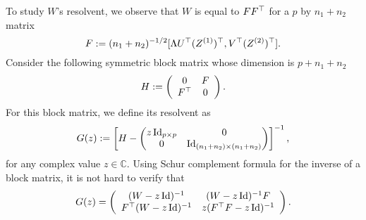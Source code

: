 To study $W$'s resolvent, we observe that $W$ is equal to $FF^{\top}$ for a $p$ by $n_1 + n_2$ matrix
	\[ F := (n_1+ n_2)^{-1/2} [\Lambda U^\top (Z^{(1)})^\top,V^\top (Z^{(2)})^\top]. \]
Consider the following symmetric block matrix whose dimension is $p + n_1 + n_2$
 \begin{equation}\label{linearize_block}
    H \define \left( {\begin{array}{*{20}c}
   0 & \AF  \\
   \AF^{\top} & 0
   \end{array}} \right).
 \end{equation}
For this block matrix, we define its resolvent as
$$G(z) := \left[H - \begin{pmatrix}z\operatorname{Id}_{p\times p}&0\\ 0 & \operatorname{Id}_{(n_1+n_2)\times (n_1+n_2)} \end{pmatrix}\right]^{-1},$$
for any complex value $z\in \mathbb C$.
Using Schur complement formula for the inverse of a block matrix, it is not hard to verify that
	\begin{equation*} %
	  G(z) =  \left( {\begin{array}{*{20}c}
			(W- z\id)^{-1} & (W - z\id)^{-1} \AF  \\
      \AF^\top (W - z\id)^{-1} & z(\AF^\top \AF - z\id)^{-1}
		\end{array}} \right).%
  \end{equation*}



